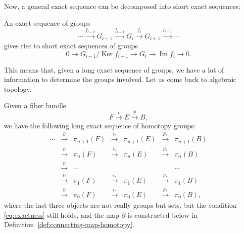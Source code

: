 \documentclass[12pt]{article}
\numberwithin{equation}{section}
\numberwithin{figure}{section}
\theoremstyle{remark}
\def\Ker{\mathop{\mathrm{Ker}}}
\def\Im{\mathop{\mathrm{Im}}}
\begin{document}
Now, a general exact sequence can be decomposed into short exact sequences:
\begin{proposition}
  An exact sequence of groups\begin{equation}
    \cdots 
    \stackrel{f_{i-2}}{\longrightarrow} G_{i-1} 
    \stackrel{f_{i-1}}{\longrightarrow} G_{i}
    \stackrel{f_{i}}{\longrightarrow} G_{i+1}
    \stackrel{f_{i+1}}{\longrightarrow} \cdots
  \end{equation}
  gives rise to short exact sequences of groups \begin{equation}
    0 \to G_{i-1}/\Ker f_{i-1} \to G_i \to \Im f_{i} \to 0.
  \end{equation}
\end{proposition}

This means that, given a long exact sequence of groups,
we have a lot of information to determine the groups involved.
Let us come back to algebraic topology.
\begin{theorem}
  \label{thm:long-exact-seq-homotopy}
  Given a fiber bundle \begin{equation}
    F\stackrel{\iota}{\longrightarrow} E\stackrel{p}{\longrightarrow} B,
  \end{equation}
  we have the following long exact sequence of homotopy groups: 
  \begin{equation}\begin{array}{cccccccc}
    \cdots 
      & \stackrel{\partial}{\longrightarrow} & \pi_{n+1}(F)  
      & \stackrel{\iota_*}{\longrightarrow} & \pi_{n+1}(E)
      & \stackrel{p_*}{\longrightarrow} & \pi_{n+1}(B)  \\
      & \stackrel{\partial}{\longrightarrow} & \pi_{n}(F)  
      & \stackrel{\iota_*}{\longrightarrow} & \pi_{n}(E)
      & \stackrel{p_*}{\longrightarrow} & \pi_{n}(B)  \\
      & \stackrel{\partial}{\longrightarrow} & \cdots & &&& \cdots \\
      & \stackrel{\partial}{\longrightarrow} & \pi_{1}(F)  
      & \stackrel{\iota_*}{\longrightarrow} & \pi_{1}(E)
      & \stackrel{p_*}{\longrightarrow} & \pi_{1}(B) \\
      & \stackrel{\partial}{\longrightarrow} & \pi_{0}(F)  
      & \stackrel{\iota_*}{\longrightarrow} & \pi_{0}(E)
      & \stackrel{p_*}{\longrightarrow} & \pi_{0}(B),
      \end{array}\end{equation}
      where the last three objects are not really groups but sets,
      but the condition \eqref{eq:exactness} still holds,
      and the map $\partial$ is constructed below in Definition~\ref{def:connecting-map-homotopy}.  
\end{theorem}
\end{document}
